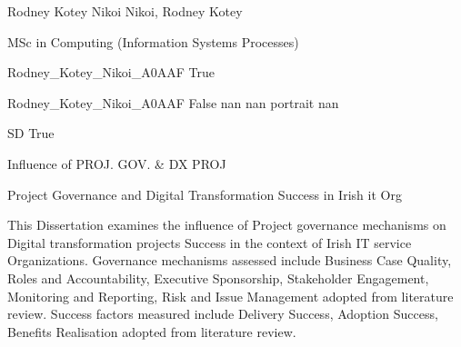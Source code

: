 \documentclass[twoside]{report}
\begin{document}
\begingroup{}\relax



\def\Key{Rodney_Kotey_Nikoi_A0AAF}

{Rodney Kotey Nikoi}
{Nikoi, Rodney Kotey}

{MSc in Computing (Information Systems Processes)}

{Rodney_Kotey_Nikoi_A0AAF}
{True}

{Rodney_Kotey_Nikoi_A0AAF}
{False}
{nan}
{nan}
{portrait}
{nan}

{SD}
{True}

{Influence of PROJ. GOV. \& DX PROJ}

{Project Governance and Digital Transformation Success in Irish it Org}

{This Dissertation examines the influence of Project governance mechanisms on Digital transformation projects Success in the context of Irish IT service Organizations. Governance mechanisms assessed include Business Case Quality, Roles and Accountability, Executive Sponsorship, Stakeholder Engagement, Monitoring and Reporting, Risk and Issue Management adopted from literature review. Success factors measured include Delivery Success, Adoption Success, Benefits Realisation adopted from literature review.}
\end{document}
